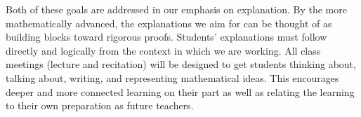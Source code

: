 \documentclass{ximera}
\begin{document}
Both of these goals are addressed in our emphasis on explanation.  By the more mathematically advanced, the explanations we aim for can be thought of as building blocks toward rigorous proofs.  Students' explanations must follow directly and logically from the context in which we are working.  All class meetings (lecture and recitation) will be designed to get students thinking about, talking about, writing, and representing mathematical ideas.  This encourages deeper and more connected learning on their part as well as relating the learning to their own preparation as future teachers.  
\end{document}
